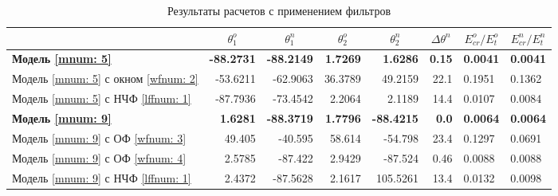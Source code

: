 \begin{table}
\footnotesize
\centering
\caption{Результаты расчетов с применением фильтров}
\renewcommand{\arraystretch}{1.5}
\begin{tabularx}{\textwidth}{X|rr|rr|r|ll}
				&\multicolumn{1}{c}{$\theta_1^o$} & \multicolumn{1}{c|}{$\theta_1^n$} & \multicolumn{1}{c}{$\theta_2^o$} & \multicolumn{1}{c|}{$\theta_2^n$} & \multicolumn{1}{c|}{$\Delta\theta^n$}& \multicolumn{1}{c}{$E_{cr}^o/E_{t}^o$} & \multicolumn{1}{c}{$E_{cr}^n/E_{t}^n$} \\ \hline
\hline  \textbf{Модель \ref{mnum: 5}} 	& \textbf{-88.2731} & \textbf{-88.2149} & \textbf{1.7269} & \textbf{1.6286} & \textbf{0.15} & \textbf{0.0041} & \textbf{0.0041} \\
		Модель \ref{mnum: 5} с окном \ref{wfnum: 2}  & -53.6211 & -62.9063 & 36.3789 & 49.2159 & 22.1 & 0.1951 & 0.1362 \\
	    Модель \ref{mnum: 5} с НЧФ \ref{lffnum: 1}  	& -87.7936 & -73.4542 & 2.2064 & 2.1189 & 14.4 & 0.0107 & 0.0084 \\
\hline	\textbf{Модель \ref{mnum: 9}} & \textbf{1.6281} & \textbf{-88.3719} & \textbf{1.7796}  & \textbf{-88.4215}  & \textbf{0.0}  & \textbf{0.0064} & \textbf{0.0064} \\
		Модель \ref{mnum: 9} с ОФ \ref{wfnum: 3} & 49.405 & -40.595 & 58.614  & -54.798  & 23.4  & 0.1297 & 0.0691 \\
		Модель \ref{mnum: 9} с ОФ \ref{wfnum: 4} & 2.5785 & -87.422 & 2.9429  & -87.524  & 0.46  & 0.0088 & 0.0088 \\
		Модель \ref{mnum: 9} с НЧФ \ref{lffnum: 1} & 2.4372 & -87.5628 & 2.1617  & 105.5261  & 13.4  & 0.0132 & 0.0098 \\
\end{tabularx} 
\renewcommand{\arraystretch}{1.0}
\end{table}